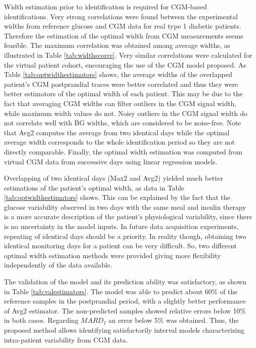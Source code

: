 Width estimation prior to identification is required for CGM-based identifications. Very strong correlations were found between the experimental widths from reference glucose and CGM data for real type 1 diabetic patients. Therefore the estimation of the optimal width from CGM measurements seems feasible. The maximum correlation was obtained among average widths, as illustrated in Table \ref{tab:widthscorre}. Very similar correlations were calculated for the virtual patient cohort, encouraging the use of the CGM model proposed. As Table \ref{tab:optwidthestimators} shows, the average widths of the overlapped patient's CGM postprandial traces were better correlated and thus they were better estimators of the optimal width of each patient. This may be due to the fact that averaging CGM widths can filter outliers in the CGM signal width, while maximum width values do not. Noisy outliers in the CGM signal width do not correlate well with BG widths, which are considered to be noise-free. Note that Avg2 computes the average from two identical days while the optimal average width corresponds to the whole identification period so they are not directly comparable. Finally, the optimal width estimation was computed from virtual CGM data from successive days using linear regression models.
 
Overlapping of two identical days (Max2 and Avg2) yielded much better estimations of the patient's optimal width, as data in Table \ref{tab:optwidthestimators} shows. This can be explained by the fact that the glucose variability observed in two days with the same meal and insulin therapy is a more accurate description of the patient's physiological variability, since there is no uncertainty in the model inputs. In future data acquisition experiments, repeating of identical days should be a priority. In reality though, obtaining two identical monitoring days for a patient can be very difficult. So, two different optimal width estimation methods were provided giving more flexibility independently of the data available.

The validation of the model and its prediction ability was satisfactory, as shown in Table \ref{tab:valestimators}. The model was able to predict about 60\% of the reference samples in the postprandial period, with a slightly better performance of Avg2 estimator. The non-predicted samples showed relative errors below 10\% in both cases. Regarding $MARD_I$ an error below 5\% was obtained. Thus, the proposed method allows identifying satisfactorily interval models characterizing intra-patient variability from CGM data. 

